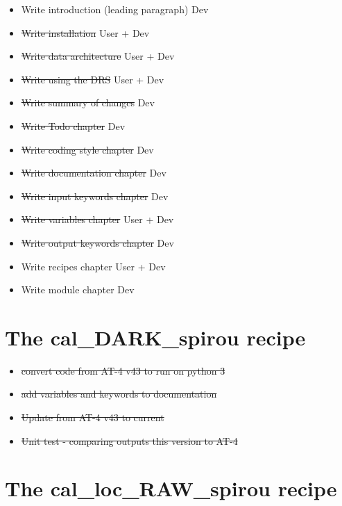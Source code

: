 \begin{itemize}
	\item Write introduction (leading paragraph) \dotfill Dev
	\item \sout{Write installation} \dotfill User + Dev
	\item \sout{Write data architecture} \dotfill User + Dev
	\item \sout{Write using the DRS} \dotfill User + Dev
	\item \sout{Write summary of changes} \dotfill Dev
	\item \sout{Write Todo chapter} \dotfill Dev
	\item \sout{Write coding style chapter} \dotfill Dev
	\item \sout{Write documentation chapter} \dotfill Dev
	\item \sout{Write input keywords chapter} \dotfill Dev
	\item \sout{Write variables chapter} \dotfill User + Dev
	\item \sout{Write output keywords chapter} \dotfill Dev
	\item Write recipes chapter \dotfill User + Dev
	\item Write module chapter \dotfill Dev
\end{itemize}


\section{The cal\_DARK\_spirou recipe}
\label{ch:todo:cal_DARK_spirou}

\begin{itemize}
	\item \sout{convert code from AT-4 v43 to run on python 3}
	\item \sout{add variables and keywords to documentation}
	\item \sout{Update from AT-4 v43 to current}
	\item \sout{Unit test - comparing outputs this version to AT-4}
\end{itemize}

\section{The cal\_loc\_RAW\_spirou recipe}
\label{ch:todo:cal_loc_RAW_spirou}


